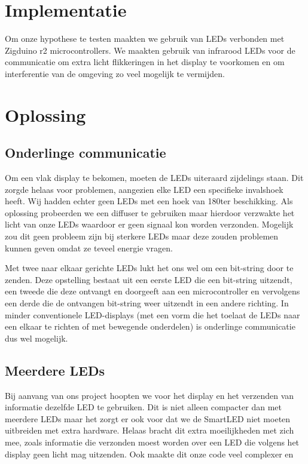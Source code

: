\documentclass{article}
\begin{document}
\section{Implementatie}
Om onze hypothese te testen maakten we gebruik van LEDs verbonden met Zigduino r2 microcontrollers. We maakten gebruik van infrarood LEDs voor de communicatie om extra licht flikkeringen in het display te voorkomen en om interferentie van de omgeving zo veel mogelijk te vermijden.


\section{Oplossing}

\subsection{Onderlinge communicatie}
Om een vlak display te bekomen, moeten de LEDs uiteraard zijdelings staan. Dit zorgde helaas voor problemen, aangezien elke LED een specifieke invalshoek heeft. Wij hadden echter geen LEDs met een hoek van 180\degree ter beschikking. Als oplossing probeerden we een diffuser te gebruiken maar hierdoor verzwakte het licht van onze LEDs waardoor er geen signaal kon worden verzonden. Mogelijk zou dit geen probleem zijn bij sterkere LEDs maar deze zouden problemen kunnen geven omdat ze teveel energie vragen. 

Met twee naar elkaar gerichte LEDs lukt het ons wel om een bit-string door te zenden. Deze opstelling bestaat uit een eerste LED die een bit-string uitzendt, een tweede die deze ontvangt en doorgeeft aan een microcontroller en vervolgens een derde die de ontvangen bit-string weer uitzendt in een andere richting. In minder conventionele LED-displays (met een vorm die het toelaat de LEDs naar een elkaar te richten of met bewegende onderdelen) is onderlinge communicatie dus wel mogelijk.

\subsection{Meerdere LEDs}
Bij aanvang van ons project hoopten we voor het display en het verzenden van informatie dezelfde LED te gebruiken. Dit is niet alleen compacter dan met meerdere LEDs maar het zorgt er ook voor dat we de SmartLED niet moeten uitbreiden met extra hardware. Helaas bracht dit extra moeilijkheden met zich mee, zoals informatie die verzonden moest worden over een LED die volgens het display geen licht mag uitzenden. Ook maakte dit onze code veel complexer en  
\end{document}
